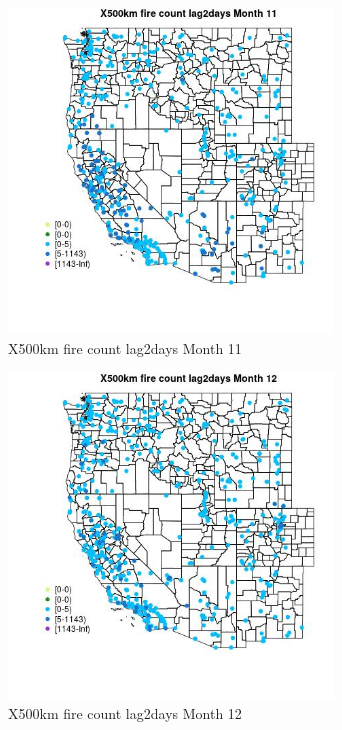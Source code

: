 \begin{figure} 
\centering  
\includegraphics[width=0.77\textwidth]{Code_Outputs/Report_ML_input_PM25_Step4_part_e_de_duplicated_aves_compiled_2019-05-14wNAs_MapObsMo11X500km_fire_count_lag2days.jpg} 
\caption{\label{fig:Report_ML_input_PM25_Step4_part_e_de_duplicated_aves_compiled_2019-05-14wNAsMapObsMo11X500km_fire_count_lag2days}X500km fire count lag2days Month 11} 
\end{figure} 
 

\begin{figure} 
\centering  
\includegraphics[width=0.77\textwidth]{Code_Outputs/Report_ML_input_PM25_Step4_part_e_de_duplicated_aves_compiled_2019-05-14wNAs_MapObsMo12X500km_fire_count_lag2days.jpg} 
\caption{\label{fig:Report_ML_input_PM25_Step4_part_e_de_duplicated_aves_compiled_2019-05-14wNAsMapObsMo12X500km_fire_count_lag2days}X500km fire count lag2days Month 12} 
\end{figure} 
 

